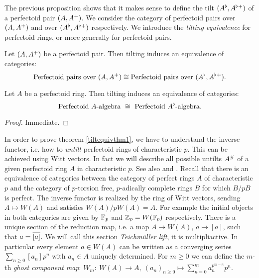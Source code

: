 The previous proposition shows that it makes sense to define the tilt $(A^{\flat},A^{\flat}{^{+}})$ of a perfectoid pair $(A,A{^{+}})$. We consider the category of perfectoid pairs over $(A,A{^{+}})$ and over $(A^{\flat},A^{\flat}{^{+}})$ respectively.
We introduce the \emph{tilting equivalence} for perfectoid rings, or more generally for perfectoid pairs.
\begin{theorem}\label{tiltequivthm1}
Let $(A,A{^{+}})$ be a perfectoid pair. Then tilting induces an equivalence of categories:
\[\textrm{Perfectoid pairs over } (A,A{^{+}})\cong\textrm{Perfectoid pairs over } (A^{\flat},A^{\flat}{^{+}}).\]
\end{theorem}
\begin{cor}
Let $A$ be a perfectoid ring. Then tilting induces an equivalence of categories:
\[\textrm{Perfectoid } A\textrm{-algebra }\cong \textrm{ Perfectoid } A^{\flat}\textrm{-algebra}.\]
\end{cor}
\begin{proof}
Immediate.
\end{proof}


In order to prove theorem \ref{tiltequivthm1}, we have to understand the inverse functor, i.e. how to \emph{untilt} perfectoid rings of characteristic $p$.
This can be achieved using Witt vectors. In fact we will describe all possible untilts $A^{\#}$ of a given perfectoid ring $A$ in characteristic $p$.
See also \cite[lemma 3.14]{Scholzeetcoh21} and \cite[proposition 1.1]{Fontaine13}.
Recall that there is an equivalence of categories between the category of perfect rings $A$ of characteristic $p$ and the category of $p$-torsion free, $p$-adically complete rings 
$B$ for which $B/pB$ is perfect. The inverse functor is realized by the ring of Witt vectors, sending $A\mapsto W(A)$ and satisfies $W(A)/pW(A)=A$.
For example the initial objects in both categories are given by $\mathbb{F}_p$ and $\mathbb{Z}_p=W(\mathbb{F}_p)$ respectively.
There is a unique section of the reduction map, i.e. a map $A\to W(A)$, $a\mapsto[a]$, such that $a=\overline{[a]}.$
We will call this section \textit{Teichmüller lift}, it is multipliactive. In particular every element $a\in W(A)$ can be written as a converging series $\sum_{n\geq0}[a_n]p^n$ 
with $a_n\in A$ uniquely determined.  For $m\geq 0$ we can define the $m$-th \emph{ghost component map}:
$W_m\colon\: W(A)\to A, \:(a_n)_{n\geq0}\mapsto \sum_{n=0}^{m}a_n^{p^{m-n}}p^n$.


